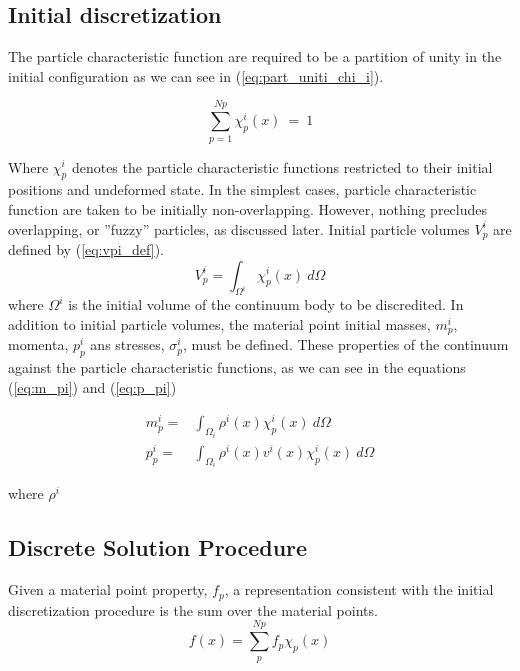 \subsection{Initial discretization}
\label{sec:ini_discr}

The particle characteristic function are required to be a partition of
unity in the initial configuration as we can see in
(\ref{eq:part_uniti_chi_i}).

\begin{equation}
  \label{eq:part_uniti_chi_i}
  \sum_{p=1}^{Np}\chi_p^i(x)\ =\ 1
\end{equation}

Where $\chi_p^i$ denotes the particle characteristic functions
restricted to their initial positions and undeformed state. In the
simplest cases, particle characteristic function are taken to be
initially non-overlapping. However, nothing precludes overlapping, or
''fuzzy'' particles, as discussed later. Initial particle volumes
$V_p^i$ are defined by (\ref{eq:vpi_def}).
\begin{equation}
  \label{eq:vpi_def}
  V_p^i = \int_{\Omega^i}\chi^i_p(x)\ d\Omega
\end{equation}
where $\Omega^i$ is the initial volume of the continuum body to be
discredited. In addition to initial particle volumes, the material
point initial masses, $m_p^i$, momenta, $p_p^i$ ans stresses,
$\sigma_p^i$, must be defined. These properties of the continuum
against the particle characteristic functions, as we can see in the
equations (\ref{eq:m_pi}) and (\ref{eq:p_pi})

\begin{align}
  \label{eq:m_pi}
  m_p^i =& \int_{\Omega_i}\rho^i(x)\chi_p^i(x)\ d\Omega \\
  \label{eq:p_pi}
  p_p^i =& \int_{\Omega_i}\rho^i(x)v^i(x)\chi_p^i(x)\ d\Omega
\end{align}

where $\rho^i$

\subsection{Discrete Solution Procedure}
\label{sec:discr_sol_proc}

Given a material point property, $f_p$, a representation consistent
with the initial discretization procedure is the sum over the material
points.
\begin{equation}
  \label{eq:mat_point_discretiz}
  f(x) = \sum_p^{Np}f_p \chi_p(x)  
\end{equation}

